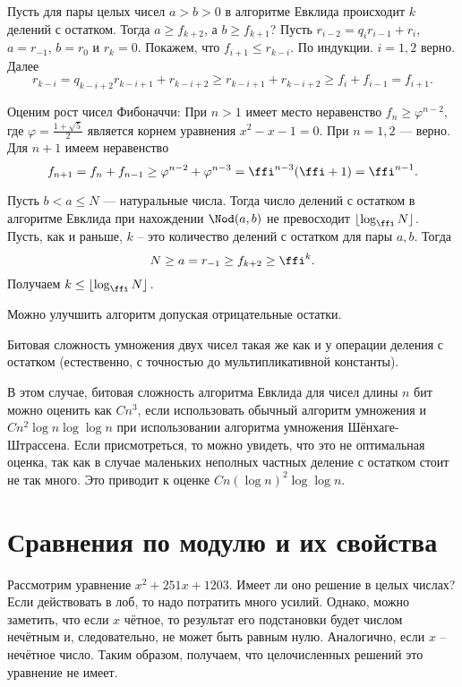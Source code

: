 \lm Пусть для пары целых чисел $a>b>0$ в алгоритме Евклида происходит $k$ делений с остатком. Тогда $a\geq f_{k+2}$, а $b\geq f_{k+1}$? 
\elm
\proof Пусть $r_{i-2}=q_ir_{i-1}+r_i$, $a=r_{-1}$, $b=r_0$ и $r_k=0$. Покажем, что $f_{i+1}\leq r_{k-i}$. По индукции. $i=1,2$ верно. Далее
$$r_{k-i}=q_{k-i+2}r_{k-i+1}+r_{k-i+2}\geq r_{k-i+1}+r_{k-i+2}\geq f_i+f_{i-1}=f_{i+1}.$$
\endproof

Оценим рост чисел Фибоначчи:
\lm При $n>1$ имеет место неравенство $f_n\geq \varphi^{n-2}$, где $\varphi=\frac{1+\sqrt{5}}{2}$ является корнем уравнения $x^2-x-1=0$. 
\elm
\proof При $n=1,2$ --- верно. Для $n+1$ имеем неравенство
 $$f_{n+1}=f_n+f_{n-1}\geq \varphi^{n-2}+\varphi^{n-3}=\ffi^{n-3}(\ffi+1)=\ffi^{n-1}.$$
\endproof

\thrm Пусть $b<a\leq N$ --- натуральные числа. Тогда число делений с остатком в алгоритме Евклида при нахождении $\Nod(a,b)$  не превосходит $\left\lfloor \log_{\ffi} N\right\rfloor$. 
\ethrm
\proof Пусть, как и раньше, $k$ -- это количество делений с остатком для пары $a,b$. Тогда
$$N\geq a=r_{-1}\geq f_{k+2} \geq \ffi^k.$$ 
Получаем $k\leq \left\lfloor \log_{\ffi} N\right\rfloor.$ 
\endproof

\rm Можно улучшить алгоритм допуская отрицательные остатки.
\erm

\fct Битовая сложность умножения двух чисел такая же как и у операции деления с остатком (естественно, с точностью до мультипликативной константы).
\efct

\rm В этом случае, битовая сложность алгоритма Евклида для чисел длины $n$ бит можно оценить как $ C n^3$, если использовать обычный алгоритм умножения и $C n^2\log n \log \log n$ при использовании алгоритма умножения Шёнхаге-Штрассена. Если присмотреться, то можно увидеть, что это не оптимальная оценка, так как в случае маленьких неполных частных деление с остатком стоит не так много. Это приводит к оценке $C n (\log n)^2\log\log n$.
\erm




\section{Сравнения по модулю и их свойства} 

Рассмотрим уравнение $x^2+251x+1203$. Имеет ли оно решение в целых числах? Если действовать в лоб, то надо потратить много усилий. Однако, можно заметить, что если $x$ чётное, то результат его подстановки будет числом нечётным и, следовательно, не может быть равным нулю. Аналогично, если $x$ -- нечётное число. Таким образом, получаем, что целочисленных решений это уравнение не имеет. 

